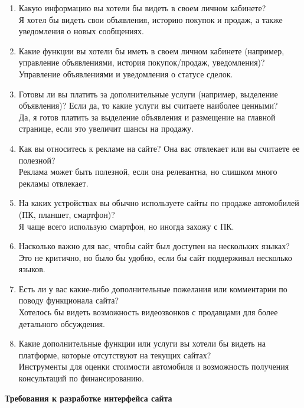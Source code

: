 \begin{enumerate}
    \item Какую информацию вы хотели бы видеть в своем личном кабинете?\\
        Я хотел бы видеть свои объявления, историю покупок и продаж, а также уведомления о новых сообщениях.
    \item Какие функции вы хотели бы иметь в своем личном кабинете (например, управление объявлениями, история покупок/продаж, уведомления)?\\
        Управление объявлениями и уведомления о статусе сделок.
    \item Готовы ли вы платить за дополнительные услуги (например, выделение объявления)? Если да, то какие услуги вы считаете наиболее ценными?\\
        Да, я готов платить за выделение объявления и размещение на главной странице, если это увеличит шансы на продажу.
    \item Как вы относитесь к рекламе на сайте? Она вас отвлекает или вы считаете ее полезной?\\
        Реклама может быть полезной, если она релевантна, но слишком много рекламы отвлекает.
    \item На каких устройствах вы обычно используете сайты по продаже автомобилей (ПК, планшет, смартфон)?\\
        Я чаще всего использую смартфон, но иногда захожу с ПК.
    \item Насколько важно для вас, чтобы сайт был доступен на нескольких языках?\\
        Это не критично, но было бы удобно, если бы сайт поддерживал несколько языков.
    \item Есть ли у вас какие-либо дополнительные пожелания или комментарии по поводу функционала сайта?\\
        Хотелось бы видеть возможность видеозвонков с продавцами для более детального обсуждения.
    \item Какие дополнительные функции или услуги вы хотели бы видеть на платформе, которые отсутствуют на текущих сайтах?\\
        Инструменты для оценки стоимости автомобиля и возможность получения консультаций по финансированию.
\end{enumerate}
\bigskip

\textbf{Требования к разработке интерфейса сайта}
\bigskip

